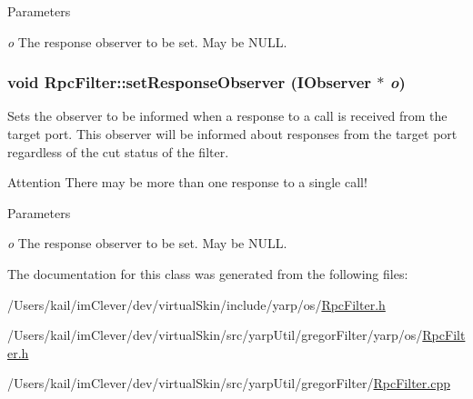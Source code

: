\begin{DoxyParams}{Parameters}
\item[{\em o}]The response observer to be set. May be {\ttfamily NULL}. \end{DoxyParams}
\hypertarget{classyarp_1_1os_1_1_rpc_filter_a9842c9621ae44b7f09e7faf33277dc05}{
\subsubsection[{setResponseObserver}]{\setlength{\rightskip}{0pt plus 5cm}void RpcFilter::setResponseObserver ({\bf IObserver} $\ast$ {\em o})}}
\label{classyarp_1_1os_1_1_rpc_filter_a9842c9621ae44b7f09e7faf33277dc05}
Sets the observer to be informed when a response to a call is received from the target port. This observer will be informed about responses from the target port regardless of the cut status of the filter.

\begin{DoxyAttention}{Attention}
There may be more than one response to a single call! 
\end{DoxyAttention}

\begin{DoxyParams}{Parameters}
\item[{\em o}]The response observer to be set. May be {\ttfamily NULL}. \end{DoxyParams}


The documentation for this class was generated from the following files:\begin{DoxyCompactItemize}
\item 
/Users/kail/imClever/dev/virtualSkin/include/yarp/os/\hyperlink{include_2yarp_2os_2_rpc_filter_8h}{RpcFilter.h}\item 
/Users/kail/imClever/dev/virtualSkin/src/yarpUtil/gregorFilter/yarp/os/\hyperlink{src_2yarp_util_2gregor_filter_2yarp_2os_2_rpc_filter_8h}{RpcFilter.h}\item 
/Users/kail/imClever/dev/virtualSkin/src/yarpUtil/gregorFilter/\hyperlink{_rpc_filter_8cpp}{RpcFilter.cpp}\end{DoxyCompactItemize}
